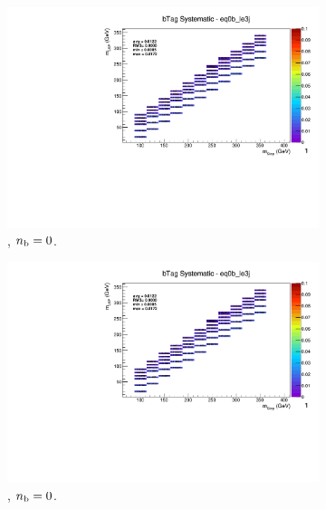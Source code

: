 \begin{figure}[ht!]
  \centering
  \begin{subfigure}[b]{0.32\textwidth}
    \includegraphics[width=\textwidth, page=12]{Figs/sms/t2cc/v37/systs/T2cc_bTag_eq0b_le3j.pdf}
    \caption{\njlow, $n_{\text{b}} = 0$.}
  \end{subfigure}
  \begin{subfigure}[b]{0.32\textwidth}
    \includegraphics[width=\textwidth, page=8]{Figs/sms/t2cc/v37/systs/T2cc_bTag_eq0b_le3j.pdf}
    \caption{\njlow, $n_{\text{b}} = 0$.}
  \end{subfigure}
  \begin{subfigure}[b]{0.32\textwidth}

\end{subfigure}
\end{figure}
